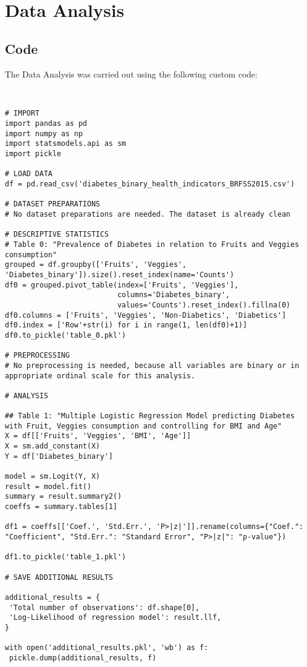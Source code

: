 \documentclass[11pt]{article}
\begin{document}
\section{Data Analysis} \subsection{Code}The Data Analysis was carried out using the following custom code:

\begin{verbatim}


# IMPORT
import pandas as pd
import numpy as np
import statsmodels.api as sm
import pickle

# LOAD DATA
df = pd.read_csv('diabetes_binary_health_indicators_BRFSS2015.csv')

# DATASET PREPARATIONS
# No dataset preparations are needed. The dataset is already clean 

# DESCRIPTIVE STATISTICS
# Table 0: "Prevalence of Diabetes in relation to Fruits and Veggies consumption"
grouped = df.groupby(['Fruits', 'Veggies', 'Diabetes_binary']).size().reset_index(name='Counts')
df0 = grouped.pivot_table(index=['Fruits', 'Veggies'], 
                          columns='Diabetes_binary', 
                          values='Counts').reset_index().fillna(0)
df0.columns = ['Fruits', 'Veggies', 'Non-Diabetics', 'Diabetics']
df0.index = ['Row'+str(i) for i in range(1, len(df0)+1)]
df0.to_pickle('table_0.pkl')

# PREPROCESSING 
# No preprocessing is needed, because all variables are binary or in appropriate ordinal scale for this analysis.

# ANALYSIS

## Table 1: "Multiple Logistic Regression Model predicting Diabetes with Fruit, Veggies consumption and controlling for BMI and Age"
X = df[['Fruits', 'Veggies', 'BMI', 'Age']]
X = sm.add_constant(X)
Y = df['Diabetes_binary']

model = sm.Logit(Y, X)
result = model.fit()
summary = result.summary2()
coeffs = summary.tables[1]

df1 = coeffs[['Coef.', 'Std.Err.', 'P>|z|']].rename(columns={"Coef.": "Coefficient", "Std.Err.": "Standard Error", "P>|z|": "p-value"})

df1.to_pickle('table_1.pkl')

# SAVE ADDITIONAL RESULTS

additional_results = {
 'Total number of observations': df.shape[0],  
 'Log-Likelihood of regression model': result.llf,
}

with open('additional_results.pkl', 'wb') as f:
 pickle.dump(additional_results, f)

\end{verbatim}
\end{document}
